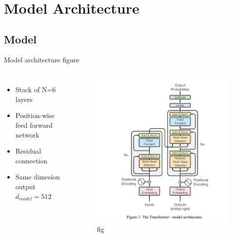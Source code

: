 \section{Model Architecture}


\subsection{Model}
\begin{frame}{Model architecture figure}
\begin{columns}
\begin{itemize}
\item Stack of N=6 layers
\item Position-wise feed forward network
\item Residual connection
\item Same dimesion output $d_{model}=512$
\end{itemize}

\begin{figure}[!h]
\includegraphics[width=\textwidth]{assets/model-fig.png}
\caption{fig}
\end{figure}

\end{columns}
\end{frame}


